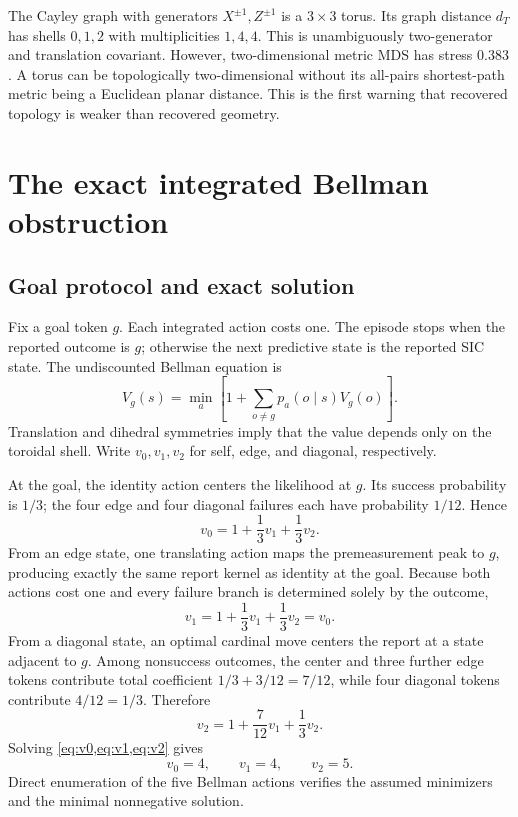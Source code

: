 \documentclass[11pt]{article}
\theoremstyle{definition}
\theoremstyle{remark}
\begin{document}
The Cayley graph with generators \(X^{\pm1},Z^{\pm1}\) is a \(3\times3\)
torus. Its graph distance \(d_T\) has shells \(0,1,2\) with multiplicities
\(1,4,4\). This is unambiguously two-generator and translation covariant.
However, two-dimensional metric MDS has stress \(0.383\). A torus can be
topologically two-dimensional without its all-pairs shortest-path metric
being a Euclidean planar distance. This is the first warning that recovered
topology is weaker than recovered geometry.

\section{The exact integrated Bellman obstruction}
\label{sec:no-go}

\subsection{Goal protocol and exact solution}

Fix a goal token \(g\). Each integrated action costs one. The episode stops
when the reported outcome is \(g\); otherwise the next predictive state is the
reported SIC state. The undiscounted Bellman equation is
\begin{equation}
\label{eq:integrated-bellman}
V_g(s)=\min_a\left[
1+\sum_{o\ne g}p_a(o\mid s)V_g(o)
\right].
\end{equation}
Translation and dihedral symmetries imply that the value depends only on the
toroidal shell. Write \(v_0,v_1,v_2\) for self, edge, and diagonal,
respectively.

At the goal, the identity action centers the likelihood at \(g\). Its success
probability is \(1/3\); the four edge and four diagonal failures each have
probability \(1/12\). Hence
\begin{equation}
v_0=1+\frac13v_1+\frac13v_2.
\label{eq:v0}
\end{equation}
From an edge state, one translating action maps the premeasurement peak to
\(g\), producing exactly the same report kernel as identity at the goal.
Because both actions cost one and every failure branch is determined solely by
the outcome,
\begin{equation}
v_1=1+\frac13v_1+\frac13v_2=v_0.
\label{eq:v1}
\end{equation}
From a diagonal state, an optimal cardinal move centers the report at a state
adjacent to \(g\). Among nonsuccess outcomes, the center and three further
edge tokens contribute total coefficient \(1/3+3/12=7/12\), while four
diagonal tokens contribute \(4/12=1/3\). Therefore
\begin{equation}
v_2=1+\frac7{12}v_1+\frac13v_2.
\label{eq:v2}
\end{equation}
Solving \cref{eq:v0,eq:v1,eq:v2} gives
\begin{equation}
\boxed{v_0=4,\qquad v_1=4,\qquad v_2=5.}
\label{eq:exact-values}
\end{equation}
Direct enumeration of the five Bellman actions verifies the assumed
minimizers and the minimal nonnegative solution.
\end{document}
